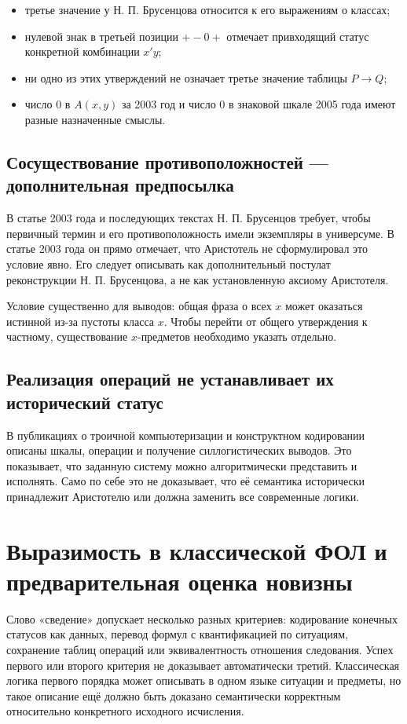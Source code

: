 \documentclass[12pt,a4paper]{article}
\begin{document}
\begin{itemize}
\item третье значение у Н. П. Брусенцова относится к его выражениям о классах;
\item нулевой знак в третьей позиции \(+-0+\) отмечает привходящий статус конкретной комбинации \(x'y\);
\item ни одно из этих утверждений не означает третье значение таблицы \(P\to Q\);
\item число \(0\) в \(A(x,y)\) за 2003 год и число \(0\) в знаковой шкале 2005 года имеют разные назначенные смыслы.
\end{itemize}
\subsection{Сосуществование противоположностей — дополнительная предпосылка}

В статье 2003 года и последующих текстах Н. П. Брусенцов требует, чтобы первичный термин и его противоположность имели экземпляры в универсуме. В статье 2003 года он прямо отмечает, что Аристотель не сформулировал это условие явно. Его следует описывать как дополнительный постулат реконструкции Н. П. Брусенцова, а не как установленную аксиому Аристотеля.

Условие существенно для выводов: общая фраза о всех \(x\) может оказаться истинной из-за пустоты класса \(x\). Чтобы перейти от общего утверждения к частному, существование \(x\)-предметов необходимо указать отдельно.

\subsection{Реализация операций не устанавливает их исторический статус}

В публикациях о троичной компьютеризации и конструктном кодировании описаны шкалы, операции и получение силлогистических выводов. Это показывает, что заданную систему можно алгоритмически представить и исполнять. Само по себе это не доказывает, что её семантика исторически принадлежит Аристотелю или должна заменить все современные логики.

\section{Выразимость в классической ФОЛ и предварительная оценка новизны}

Слово «сведение» допускает несколько разных критериев: кодирование конечных статусов как данных, перевод формул с квантификацией по ситуациям, сохранение таблиц операций или эквивалентность отношения следования. Успех первого или второго критерия не доказывает автоматически третий. Классическая логика первого порядка может описывать в одном языке ситуации и предметы, но такое описание ещё должно быть доказано семантически корректным относительно конкретного исходного исчисления.
\end{document}
